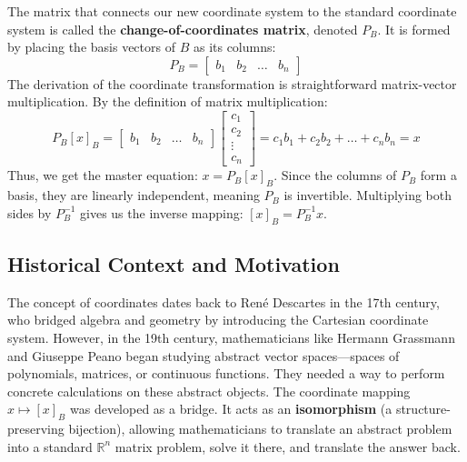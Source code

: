 \documentclass[11pt]{article}
\begin{document}
The matrix that connects our new coordinate system to the standard coordinate system is called the \textbf{change-of-coordinates matrix}, denoted $P_B$. It is formed by placing the basis vectors of $B$ as its columns:
\[ P_B = \begin{bmatrix} b_1 & b_2 & \dots & b_n \end{bmatrix} \]
The derivation of the coordinate transformation is straightforward matrix-vector multiplication. By the definition of matrix multiplication:
\[ P_B [x]_B = \begin{bmatrix} b_1 & b_2 & \dots & b_n \end{bmatrix} \begin{bmatrix} c_1 \\ c_2 \\ \vdots \\ c_n \end{bmatrix} = c_1 b_1 + c_2 b_2 + \dots + c_n b_n = x \]
Thus, we get the master equation: $x = P_B [x]_B$. Since the columns of $P_B$ form a basis, they are linearly independent, meaning $P_B$ is invertible. Multiplying both sides by $P_B^{-1}$ gives us the inverse mapping: $[x]_B = P_B^{-1} x$.

\subsection{Historical Context and Motivation}
The concept of coordinates dates back to René Descartes in the 17th century, who bridged algebra and geometry by introducing the Cartesian coordinate system. However, in the 19th century, mathematicians like Hermann Grassmann and Giuseppe Peano began studying abstract vector spaces—spaces of polynomials, matrices, or continuous functions. They needed a way to perform concrete calculations on these abstract objects. The coordinate mapping $x \mapsto [x]_B$ was developed as a bridge. It acts as an \textbf{isomorphism} (a structure-preserving bijection), allowing mathematicians to translate an abstract problem into a standard $\mathbb{R}^n$ matrix problem, solve it there, and translate the answer back.
\end{document}
